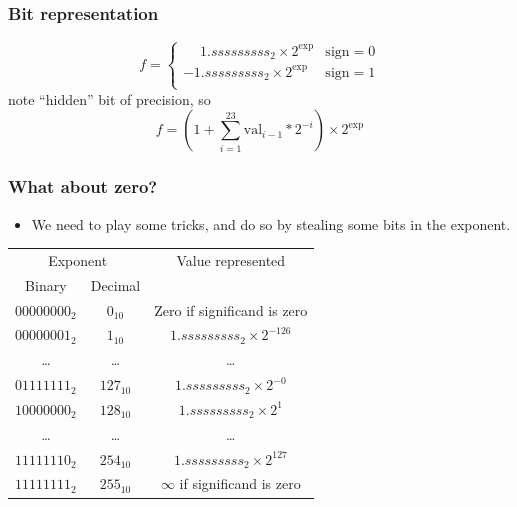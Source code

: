 \documentclass[presentation]{beamer}
\begin{document}
\begin{frame}
  \frametitle{Bit representation}
  \begin{equation*}
    f = \begin{cases}
      \phantom{-}1.sssssssss_2 \times 2^{\text{exp}} & \text{sign} = 0\\
      -1.sssssssss_2 \times 2^{\text{exp}} & \text{sign} = 1\\
     \end{cases}
   \end{equation*}
   note ``hidden'' bit of precision, so
   \begin{equation*}
     f = (1 + \sum_{i=1}^{23} \text{val}_{i-1} * 2^{-i})\times 2^{\text{exp}}
   \end{equation*}
\end{frame}

\begin{frame}
  \frametitle{What about zero?}
  \begin{itemize}
  \item We need to play some tricks, and do so by stealing some bits
    in the exponent.
  \end{itemize}
  \begin{center}
    {\small
      \begin{tabular}{c|c|c}
        \multicolumn{2}{c|}{Exponent} & Value represented\\
        Binary & Decimal & \\
        \hline
        $00000000_2$ & $0_{10}$ & Zero if significand is zero \\
        $00000001_2$ & $1_{10}$ & $1.sssssssss_2 \times 2^{-126}$ \\
        \dots & \dots & \dots \\
        $01111111_2$ & $127_{10}$ & $1.sssssssss_2 \times 2^{-0}$ \\
        $10000000_2$ & $128_{10}$ & $1.sssssssss_2 \times 2^{1}$ \\
        \dots & \dots & \dots \\
        $11111110_2$ & $254_{10}$ & $1.sssssssss_2 \times 2^{127}$ \\
        $11111111_2$ & $255_{10}$ & $\infty$ if significand is zero\\
      \end{tabular}
    }
  \end{center}
\end{frame}
\end{document}
